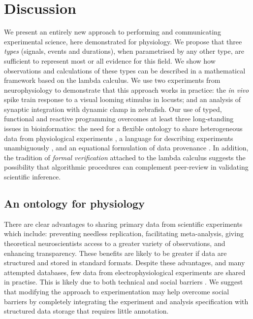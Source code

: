 \section*{Discussion}

We present an entirely new approach to performing and communicating
experimental science, here demonstrated for physiology. We propose
that three \emph{types} (signals, events and durations), when
parametrised by any other type, are sufficient to represent most or
all evidence for this field. We show how observations and calculations
of these types can be described in a mathematical framework based on
the lambda calculus. We use two experiments from neurophysiology to
demonstrate that this approach works in practice: the \emph{in vivo}
spike train response to a visual looming stimulus in locusts; and an
analysis of synaptic integration with dynamic clamp in zebrafish. Our use
of typed, functional and reactive programming overcomes at least three
long-standing issues in bioinformatics: the need for a flexible
ontology to share heterogeneous data from physiological experiments
\citep{Amari2002}, a language for describing experiments unambiguously
\citep{Murray-Rust2002}, and an equational formulation of data
provenance \citep{Pool2002}. In addition, the tradition of
\emph{formal verification} attached to the lambda calculus
\citep{Harrison2009,DeBruijn1968,Bird1996,Hindley2008}
suggests the possibility that algorithmic procedures can complement
peer-review in validating scientific inference.

\subsection*{An ontology for physiology}

There are clear advantages to sharing primary data from scientific
experiments \citep{Insel2003} which include: preventing needless replication,
facilitating meta-analysis, giving theoretical neuroscientists access
to a greater variety of observations, and enhancing transparency. These
benefits are likely to be greater if data are structured and stored in
standard formats. Despite these advantages, and many attempted
databases, few data from electrophysiological experiments are
shared in practise. This is likely due to both technical and social
barriers \citep{Amari2002}. We suggest that modifying the approach to
experimentation may help overcome social barriers by completely
integrating the experiment and analysis specification with structured
data storage that requires little annotation.

